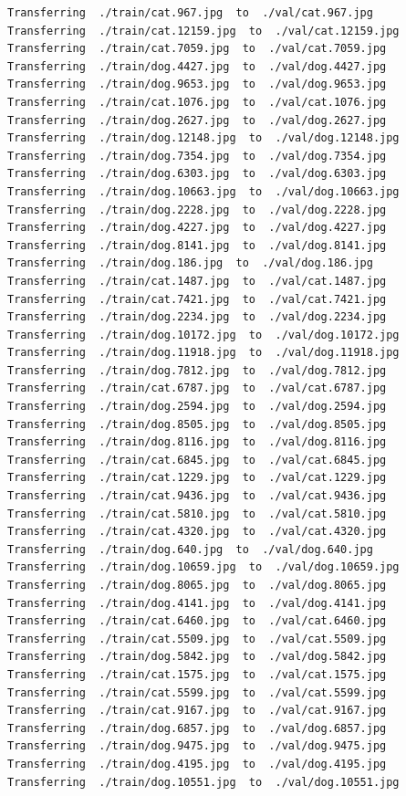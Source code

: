 \documentclass[]{book}
\theoremstyle{definition}
\theoremstyle{definition}
\theoremstyle{definition}
\theoremstyle{remark}
\begin{document}
\begin{verbatim}
Transferring  ./train/cat.967.jpg  to  ./val/cat.967.jpg
Transferring  ./train/cat.12159.jpg  to  ./val/cat.12159.jpg
Transferring  ./train/cat.7059.jpg  to  ./val/cat.7059.jpg
Transferring  ./train/dog.4427.jpg  to  ./val/dog.4427.jpg
Transferring  ./train/dog.9653.jpg  to  ./val/dog.9653.jpg
Transferring  ./train/cat.1076.jpg  to  ./val/cat.1076.jpg
Transferring  ./train/dog.2627.jpg  to  ./val/dog.2627.jpg
Transferring  ./train/dog.12148.jpg  to  ./val/dog.12148.jpg
Transferring  ./train/dog.7354.jpg  to  ./val/dog.7354.jpg
Transferring  ./train/dog.6303.jpg  to  ./val/dog.6303.jpg
Transferring  ./train/dog.10663.jpg  to  ./val/dog.10663.jpg
Transferring  ./train/dog.2228.jpg  to  ./val/dog.2228.jpg
Transferring  ./train/dog.4227.jpg  to  ./val/dog.4227.jpg
Transferring  ./train/dog.8141.jpg  to  ./val/dog.8141.jpg
Transferring  ./train/dog.186.jpg  to  ./val/dog.186.jpg
Transferring  ./train/cat.1487.jpg  to  ./val/cat.1487.jpg
Transferring  ./train/cat.7421.jpg  to  ./val/cat.7421.jpg
Transferring  ./train/dog.2234.jpg  to  ./val/dog.2234.jpg
Transferring  ./train/dog.10172.jpg  to  ./val/dog.10172.jpg
Transferring  ./train/dog.11918.jpg  to  ./val/dog.11918.jpg
Transferring  ./train/dog.7812.jpg  to  ./val/dog.7812.jpg
Transferring  ./train/cat.6787.jpg  to  ./val/cat.6787.jpg
Transferring  ./train/dog.2594.jpg  to  ./val/dog.2594.jpg
Transferring  ./train/dog.8505.jpg  to  ./val/dog.8505.jpg
Transferring  ./train/dog.8116.jpg  to  ./val/dog.8116.jpg
Transferring  ./train/cat.6845.jpg  to  ./val/cat.6845.jpg
Transferring  ./train/cat.1229.jpg  to  ./val/cat.1229.jpg
Transferring  ./train/cat.9436.jpg  to  ./val/cat.9436.jpg
Transferring  ./train/cat.5810.jpg  to  ./val/cat.5810.jpg
Transferring  ./train/cat.4320.jpg  to  ./val/cat.4320.jpg
Transferring  ./train/dog.640.jpg  to  ./val/dog.640.jpg
Transferring  ./train/dog.10659.jpg  to  ./val/dog.10659.jpg
Transferring  ./train/dog.8065.jpg  to  ./val/dog.8065.jpg
Transferring  ./train/dog.4141.jpg  to  ./val/dog.4141.jpg
Transferring  ./train/cat.6460.jpg  to  ./val/cat.6460.jpg
Transferring  ./train/cat.5509.jpg  to  ./val/cat.5509.jpg
Transferring  ./train/dog.5842.jpg  to  ./val/dog.5842.jpg
Transferring  ./train/cat.1575.jpg  to  ./val/cat.1575.jpg
Transferring  ./train/cat.5599.jpg  to  ./val/cat.5599.jpg
Transferring  ./train/cat.9167.jpg  to  ./val/cat.9167.jpg
Transferring  ./train/dog.6857.jpg  to  ./val/dog.6857.jpg
Transferring  ./train/dog.9475.jpg  to  ./val/dog.9475.jpg
Transferring  ./train/dog.4195.jpg  to  ./val/dog.4195.jpg
Transferring  ./train/dog.10551.jpg  to  ./val/dog.10551.jpg

\end{verbatim}
\end{document}
